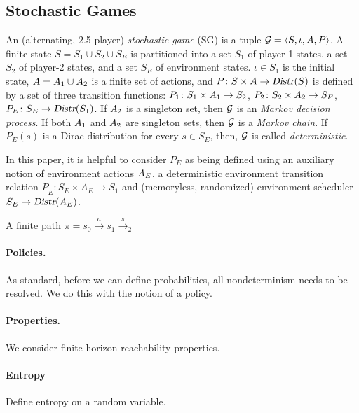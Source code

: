 \subsection{Stochastic Games}
An (alternating, 2.5-player) \emph{stochastic game} (SG) is a tuple $\mathcal{G} = \langle S, \iota, A, P \rangle$. A finite state $S = S_1 \cup S_2 \cup S_E$ is partitioned into a set $S_1$ of player-1 states, a set $S_2$ of player-2 states, and a set $S_E$ of environment states. $\iota \in S_1$ is the initial state, $A = A_1 \cup A_2$ is a finite set of actions, and $P\colon S \times A \rightarrow \textsl{Distr}(S)$ is defined by a set of three transition functions: $P_1\colon S_1 \times A_1 \rightarrow S_2$, $P_2\colon S_2 \times A_2 \rightarrow S_E$, $P_E\colon S_E \rightarrow \textsl{Distr}(S_1)$.
If $A_2$ is a singleton set, then $\mathcal{G}$ is an \emph{Markov decision process}.
If both $A_1$ and $A_2$ are singleton sets, then $\mathcal{G}$ is a \emph{Markov chain}. If $P_E(s)$ is a Dirac distribution for every $s \in S_E$, then, $\mathcal{G}$ is called \emph{deterministic}.

In this paper, it is helpful to consider $P_E$ as being defined using an auxiliary notion of environment actions $A_E$, a deterministic environment transition relation $P_{\hat{E}}\colon S_E \times A_E \rightarrow S_1$ and (memoryless, randomized) environment-scheduler $S_E \rightarrow \textsl{Distr}(A_E)$.

A finite path $\pi = s_0 \xrightarrow{a} s_1 \xrightarrow s_2$

\paragraph{Policies.} 
As standard, before we can define probabilities, all nondeterminism needs to be resolved. We do this with the notion of a policy. 



\paragraph{Properties.}
We consider finite horizon reachability properties.

\paragraph{Entropy}


Define entropy on a random variable.

